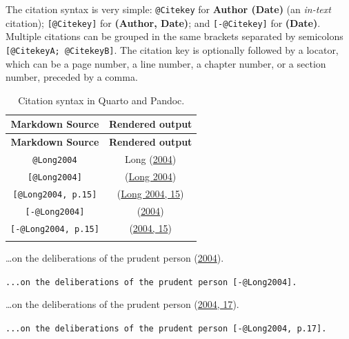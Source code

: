 \documentclass[
  12pt,
  a4paper,
  oneside,
  numbers=noenddot,
  titlepage,
  toclink=all,
  toc=bibliography]{scrbook}
\theoremstyle{definition}
\theoremstyle{definition}
\theoremstyle{definition}
\theoremstyle{plain}
\theoremstyle{plain}
\theoremstyle{plain}
\theoremstyle{plain}
\theoremstyle{plain}
\theoremstyle{remark}
\begin{document}
The citation syntax is very simple: \texttt{@Citekey} for \textbf{Author
(Date)} (an \emph{in-text} citation); \texttt{{[}@Citekey{]}} for
\textbf{(Author, Date)}; and \texttt{{[}-@Citekey{]}} for
\textbf{(Date)}. Multiple citations can be grouped in the same brackets
separated by semicolons \texttt{{[}@CitekeyA;\ @CitekeyB{]}}. The
citation key is optionally followed by a locator, which can be a page
number, a line number, a chapter number, or a section number, preceded
by a comma.

\hypertarget{tbl-scriv43}{}
\begin{longtable}[]{@{}cc@{}}
\toprule\noalign{}
\textbf{Markdown Source} & \textbf{Rendered output} \\
\midrule\noalign{}
\endfirsthead
\toprule\noalign{}
\textbf{Markdown Source} & \textbf{Rendered output} \\
\midrule\noalign{}
\endhead
\bottomrule\noalign{}
\endlastfoot
\texttt{@Long2004} & \protect\hypertarget{cite_97}{}{\label{cite_97}Long
(\protect\hyperlink{ref-Long2004}{2004})} \\
\texttt{{[}@Long2004{]}} &
\protect\hypertarget{cite_98}{}{\label{cite_98}(\protect\hyperlink{ref-Long2004}{Long
2004})} \\
\texttt{{[}@Long2004,\ p.15{]}} &
\protect\hypertarget{cite_99}{}{\label{cite_99}(\protect\hyperlink{ref-Long2004}{Long
2004, 15})} \\
\texttt{{[}-@Long2004{]}} &
\protect\hypertarget{cite_100}{}{\label{cite_100}(\protect\hyperlink{ref-Long2004}{2004})} \\
\texttt{{[}-@Long2004,\ p.15{]}} &
\protect\hypertarget{cite_101}{}{\label{cite_101}(\protect\hyperlink{ref-Long2004}{2004,
15})} \\
\caption{\label{tbl-scriv43}Citation syntax in Quarto and
Pandoc.}\tabularnewline
\end{longtable}

\begin{tcolorbox}[enhanced jigsaw, rightrule=.15mm, bottomtitle=1mm, colback=white, toptitle=1mm, left=2mm, colbacktitle=quarto-callout-note-color!10!white, opacitybacktitle=0.6, opacityback=0, arc=.35mm, leftrule=.75mm, toprule=.15mm, titlerule=0mm, breakable, coltitle=black, bottomrule=.15mm, colframe=quarto-callout-note-color-frame, title=\textcolor{quarto-callout-note-color}{\faInfo}\hspace{0.5em}{(Date)}]

\ldots on the deliberations of the prudent person
\protect\hypertarget{cite_102}{}{\label{cite_102}(\protect\hyperlink{ref-Long2004}{2004})}.

\texttt{...on\ the\ deliberations\ of\ the\ prudent\ person\ {[}-@Long2004{]}.}

\ldots on the deliberations of the prudent person
\protect\hypertarget{cite_103}{}{\label{cite_103}(\protect\hyperlink{ref-Long2004}{2004,
17})}.

\texttt{...on\ the\ deliberations\ of\ the\ prudent\ person\ {[}-@Long2004,\ p.17{]}.}

\end{tcolorbox}
\end{document}
